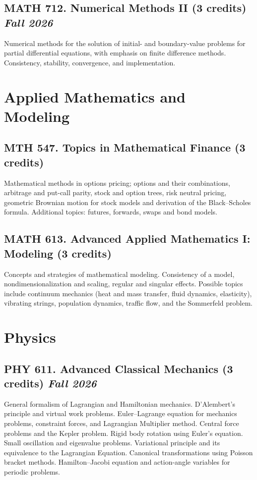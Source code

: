 \documentclass[11pt]{article}
\newcommand{\coursestatus}[1]{\hfill\normalsize\normalfont\textit{#1}}
\begin{document}
\subsection{MATH 712. Numerical Methods II \mdseries(3 credits) \coursestatus{Fall 2026}}
Numerical methods for the solution of initial- and boundary-value problems for partial differential equations, with emphasis on finite difference methods. Consistency, stability, convergence, and implementation.

\section{Applied Mathematics and Modeling}

\subsection{MTH 547. Topics in Mathematical Finance \mdseries(3 credits)}
Mathematical methods in options pricing; options and their combinations, arbitrage and put-call parity, stock and option trees, risk neutral pricing, geometric Brownian motion for stock models and derivation of the Black--Scholes formula. Additional topics: futures, forwards, swaps and bond models.

\subsection{MATH 613. Advanced Applied Mathematics I: Modeling \mdseries(3 credits)}
Concepts and strategies of mathematical modeling. Consistency of a model, nondimensionalization and scaling, regular and singular effects. Possible topics include continuum mechanics (heat and mass transfer, fluid dynamics, elasticity), vibrating strings, population dynamics, traffic flow, and the Sommerfeld problem.

\section{Physics}

\subsection{PHY 611. Advanced Classical Mechanics \mdseries(3 credits) \coursestatus{Fall 2026}}
General formalism of Lagrangian and Hamiltonian mechanics. D'Alembert's principle and virtual work problems. Euler--Lagrange equation for mechanics problems, constraint forces, and Lagrangian Multiplier method. Central force problems and the Kepler problem. Rigid body rotation using Euler's equation. Small oscillation and eigenvalue problems. Variational principle and its equivalence to the Lagrangian Equation. Canonical transformations using Poisson bracket methods. Hamilton--Jacobi equation and action-angle variables for periodic problems.
\end{document}
